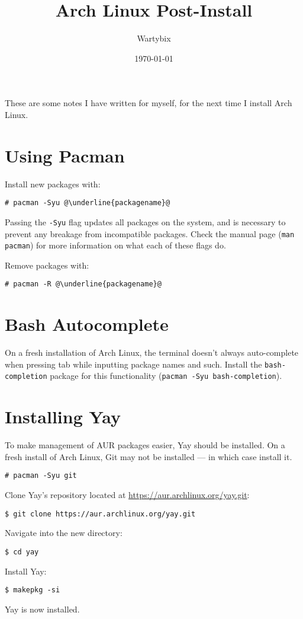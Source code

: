 \documentclass[a4paper]{article}
\title{Arch Linux Post-Install}
\author{Wartybix}
\date{\today}
\begin{document}
\maketitle

These are some notes I have written for myself, for the next time I install Arch Linux.

\section{Using Pacman}

Install new packages with:
\begin{lstlisting}[escapechar=@]
# pacman -Syu @\underline{packagename}@
\end{lstlisting}
Passing the \lstinline|-Syu| flag updates all packages on the system, and is necessary to prevent any breakage from incompatible packages.
Check the manual page (\lstinline|man pacman|) for more information on what each of these 
flags do.

Remove packages with:
\begin{lstlisting}[escapechar=@]
# pacman -R @\underline{packagename}@
\end{lstlisting}

\section{Bash Autocomplete}

On a fresh installation of Arch Linux, the terminal doesn't always auto-complete when pressing tab while inputting package names and such.
Install the \lstinline|bash-completion| package for this functionality (\lstinline|pacman -Syu bash-completion|).

\section{Installing Yay}

To make management of AUR packages easier, Yay should be installed.
On a fresh install of Arch Linux, Git may not be installed --- in which case install it.
\begin{lstlisting}
# pacman -Syu git
\end{lstlisting}
Clone Yay's repository located at \url{https://aur.archlinux.org/yay.git}:
\begin{lstlisting}
$ git clone https://aur.archlinux.org/yay.git
\end{lstlisting}
Navigate into the new directory:
\begin{lstlisting}
$ cd yay
\end{lstlisting}
Install Yay:
\begin{lstlisting}
$ makepkg -si
\end{lstlisting}
Yay is now installed.
\end{document}
